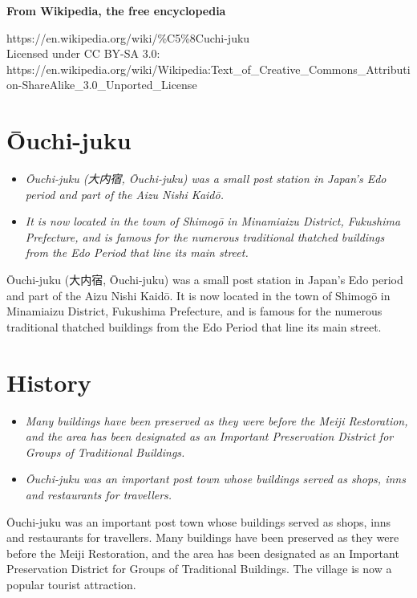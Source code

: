 \textbf{From Wikipedia, the free encyclopedia}

https://en.wikipedia.org/wiki/\%C5\%8Cuchi-juku\\
Licensed under CC BY-SA 3.0:\\
https://en.wikipedia.org/wiki/Wikipedia:Text\_of\_Creative\_Commons\_Attribution-ShareAlike\_3.0\_Unported\_License

\section{Ōuchi-juku}\label{ux14duchi-juku}

\begin{itemize}
\item
  \emph{Ōuchi-juku (大内宿, Ōuchi-juku) was a small post station in
  Japan's Edo period and part of the Aizu Nishi Kaidō.}
\item
  \emph{It is now located in the town of Shimogō in Minamiaizu District,
  Fukushima Prefecture, and is famous for the numerous traditional
  thatched buildings from the Edo Period that line its main street.}
\end{itemize}

Ōuchi-juku (大内宿, Ōuchi-juku) was a small post station in Japan's Edo
period and part of the Aizu Nishi Kaidō. It is now located in the town
of Shimogō in Minamiaizu District, Fukushima Prefecture, and is famous
for the numerous traditional thatched buildings from the Edo Period that
line its main street.

\section{History}\label{history}

\begin{itemize}
\item
  \emph{Many buildings have been preserved as they were before the Meiji
  Restoration, and the area has been designated as an Important
  Preservation District for Groups of Traditional Buildings.}
\item
  \emph{Ōuchi-juku was an important post town whose buildings served as
  shops, inns and restaurants for travellers.}
\end{itemize}

Ōuchi-juku was an important post town whose buildings served as shops,
inns and restaurants for travellers. Many buildings have been preserved
as they were before the Meiji Restoration, and the area has been
designated as an Important Preservation District for Groups of
Traditional Buildings. The village is now a popular tourist attraction.

